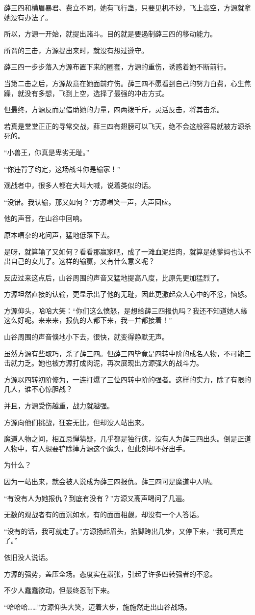 \begin{this_body}
薛三四和横眉暴君、费立不同，她有飞行蛊，只要见机不妙，飞上高空，方源就拿她没有办法了。

所以，方源一开始，就提出赌斗。目的就是要遏制薛三四的移动能力。

所谓的三击，方源提出来时，就没有想过遵守。

薛三四一步步落入方源布置下来的圈套，方源的重伤，诱惑着她不断前行。

当第二击之后，方源故意在她面前疗伤。薛三四不愿看到自己的努力白费，心生焦躁，就没有多想，飞到上空，选择了最强的冲击方式。

但最终，方源反而是借助她的力量，四两拨千斤，灵活反击，将其击杀。

若真是堂堂正正的寻常交战，薛三四有翅膀可以飞天，绝不会这般容易就被方源杀死的。

“小兽王，你真是卑劣无耻。”

“你违背了约定，这场战斗你是输家！”

观战者中，很多人都在大叫大喊，说着类似的话。

“没错。我认输，那又如何？”方源嗤笑一声，大声回应。

他的声音，在山谷中回响。

原本嘈杂的叱问声，猛地低落下去。

是呀，就算输了又如何？看看那赢家吧，成了一滩血泥烂肉，就算是她爹妈也认不出自己的女儿了。这样的输赢，又有什么意义呢？

反应过来这点后，山谷周围的声音又猛地提高八度，比原先更加猛烈了。

方源坦然直接的认输，更显示出了他的无耻，因此更激起众人心中的不忿，恼怒。

方源仰头，哈哈大笑：“你们这么愤怒，是想给薛三四报仇吗？我还不知道她人缘这么好呢。来来来，报仇的人都下来，我一并都接着！”

山谷周围的声音倏地小下去，很快，就变得静默无声。

虽然方源有些取巧，杀了薛三四。但薛三四毕竟是四转中阶的成名人物，不可能三击就力乏。她也被方源打成肉泥，再次展现出方源强大的战斗力。

方源以四转初阶修为，一连打爆了三位四转中阶的强者。这样的实力，除了有限的几人，谁不心惊胆战？

并且，方源受伤越重，战力就越强。

方源向他们挑战，狂妄无比，但却没人站出来。

魔道人物之间，相互忌惮猜疑，几乎都是独行侠，没有人为薛三四出头。倒是正道人物中，有人想要铲除掉方源这个魔头，但此刻却不好出手。

为什么？

因为一站出来，就会被人说成为薛三四报仇。薛三四可是魔道中人呐。

“有没有人为她报仇？到底有没有？”方源又高声喝问了几遍。

无数的观战者有的面沉如水，有的面面相觑，却没有一个人答话。

“没有的话，我可就走了。”方源扬起眉头，抬脚跨出几步，又停下来，“我可真走了。”

依旧没人说话。

方源的强势，盖压全场。态度实在嚣张，引起了许多四转强者的不忿。

不少人蠢蠢欲动，但最终忍耐下来。

“哈哈哈……”方源仰头大笑，迈着大步，施施然走出山谷战场。

\end{this_body}

